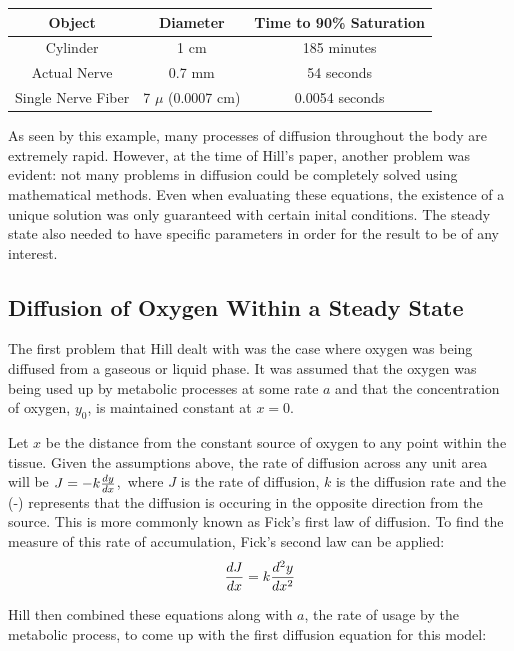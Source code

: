 \documentclass{article}
\begin{document}
\begin{tabular}{|c|c|c|}
    \hline
    Object & Diameter & Time to 90\% Saturation \\
    \hline
    Cylinder & 1 cm & 185 minutes \\
    Actual Nerve & 0.7 mm & 54 seconds \\
    Single Nerve Fiber & 7 $\mu$ (0.0007 cm) & 0.0054 seconds \\
    \hline
\end{tabular}
\vspace*{1cm}

As seen by this example, many processes of diffusion throughout the body are extremely rapid. However, at the time of Hill's
paper, another problem was evident: not many problems in diffusion could be completely solved using mathematical methods.
Even when evaluating these equations, the existence of a unique solution was only guaranteed with certain inital conditions.
The steady state also needed to have specific parameters in order for the result to be of any interest.
\subsection{Diffusion of Oxygen Within a Steady State}

The first problem that Hill dealt with was the case where oxygen was being diffused from a gaseous or liquid phase.
It was assumed that the oxygen was being used up by metabolic processes at some rate $a$ and that the concentration
of oxygen, $y_0$, is maintained constant at $x = 0$. 

\vspace*{0.5cm}

Let $x$ be the distance from the constant source of oxygen to any point within the tissue. Given the assumptions above,
the rate of diffusion across any unit area will be $ J = -k \* \frac{dy}{dx}$,\, where $J$ is the rate of diffusion, $k$ is the diffusion rate and the (-) 
represents that the diffusion is occuring in the opposite direction from the source. This is more commonly known as Fick's
first law of diffusion. To find the measure of this rate of accumulation, Fick's second law can be applied:
\begin{equation}
\frac{dJ}{dx} = k \* \frac{d^2y}{dx^2}
\end{equation}

Hill then combined these equations along with $a$, the rate of usage by the metabolic process, to come up with the first diffusion equation for
this model: 
\end{document}

